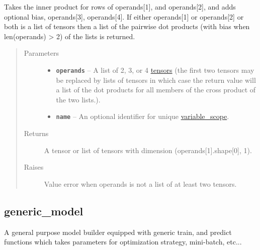 \documentclass[letterpaper,10pt,english]{sphinxmanual}
\begin{document}
\begin{fulllineitems}
\label{node_ops:node_ops.x_dot_y}
Takes the inner product for rows of operands{[}1{]}, and operands{[}2{]},
and adds optional bias, operands{[}3{]}, operands{[}4{]}.
If either operands{[}1{]} or operands{[}2{]} or both is a list of tensors
then a list of the pairwise dot products (with bias when len(operands) \textgreater{} 2)
of the lists is returned.
\begin{quote}\begin{description}
\item[{Parameters}] \leavevmode\begin{itemize}
\item {} 
\textbf{\texttt{operands}} -- A list of 2, 3, or 4 \href{https://www.tensorflow.org/versions/r0.7/api\_docs/python/framework.html\#Tensor}{tensors} (the first two tensors may be replaced by lists of tensors
in which case the return value will a list of the dot products
for all members of the cross product of the two lists.).

\item {} 
\textbf{\texttt{name}} -- An optional identifier for unique \href{https://www.tensorflow.org/versions/r0.7/how\_tos/variable\_scope/index.html}{variable\_scope}.

\end{itemize}

\item[{Returns}] \leavevmode
A tensor or list of tensors with dimension (operands{[}1{]}.shape{[}0{]}, 1).

\item[{Raises}] \leavevmode
Value error when operands is not a list of at least two tensors.

\end{description}\end{quote}

\end{fulllineitems}



\subsection{generic\_model}
\label{generic_model:generic-model}\label{generic_model::doc}\label{generic_model:tensor-decompositions-and-applications}
A general purpose model builder equipped with generic train, and predict functions which takes parameters for
optimization strategy, mini-batch, etc...
\label{generic_model:module-generic_model}
\end{document}
